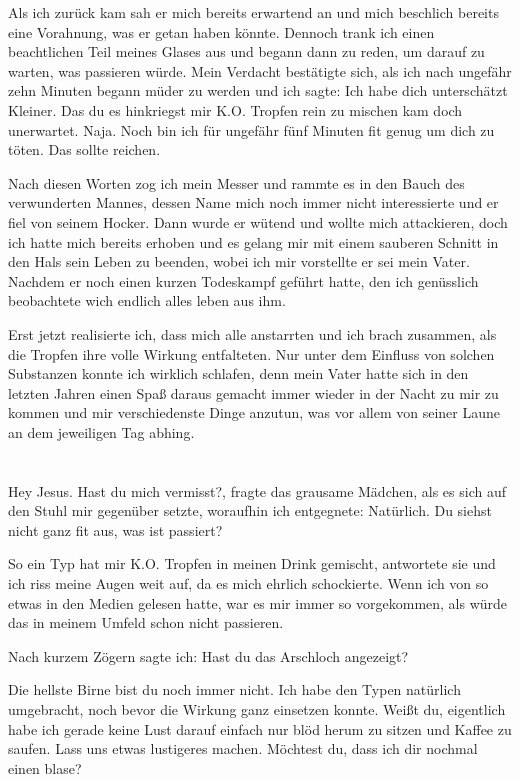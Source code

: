 \documentclass[11pt, a5paper]{article}
\begin{document}
\begin{spacing}{1.2}
		Als ich zurück kam sah er mich bereits erwartend an und mich beschlich bereits eine Vorahnung, was er getan haben könnte. Dennoch trank ich einen beachtlichen Teil meines Glases aus und begann dann zu reden, um darauf zu warten, was passieren würde. Mein Verdacht bestätigte sich, als ich nach ungefähr zehn Minuten begann müder zu werden und ich sagte: \frqq Ich habe dich unterschätzt Kleiner. Das du es hinkriegst mir K.O. Tropfen rein zu mischen kam doch unerwartet. Naja. Noch bin ich für ungefähr fünf Minuten fit genug um dich zu töten. Das sollte reichen.\flqq
		
		Nach diesen Worten zog ich mein Messer und rammte es in den Bauch des verwunderten Mannes, dessen Name mich noch immer nicht interessierte und er fiel von seinem Hocker. Dann wurde er wütend und wollte mich attackieren, doch ich hatte mich bereits erhoben und es gelang mir mit einem sauberen Schnitt in den Hals sein Leben zu beenden, wobei ich mir vorstellte er sei mein Vater. Nachdem er noch einen kurzen Todeskampf geführt hatte, den ich genüsslich beobachtete wich endlich alles leben aus ihm.
		
		Erst jetzt realisierte ich, dass mich alle anstarrten und ich brach zusammen, als die Tropfen ihre volle Wirkung entfalteten. Nur unter dem Einfluss von solchen Substanzen konnte ich wirklich schlafen, denn mein Vater hatte sich in den letzten Jahren einen Spaß daraus gemacht immer wieder in der Nacht zu mir zu kommen und mir verschiedenste Dinge anzutun, was vor allem von seiner Laune an dem jeweiligen Tag abhing.\newpage
		
		\section{}
		\frqq Hey Jesus. Hast du mich vermisst?\flqq, fragte das grausame Mädchen, als es sich auf den Stuhl mir gegenüber setzte, woraufhin ich entgegnete: \frqq Natürlich. Du siehst nicht ganz fit aus, was ist passiert?\flqq
		
		\frqq So ein Typ hat mir K.O. Tropfen in meinen Drink gemischt\flqq , antwortete sie und ich riss meine Augen weit auf, da es mich ehrlich schockierte. Wenn ich von so etwas in den Medien gelesen hatte, war es mir immer so vorgekommen, als würde das in meinem Umfeld schon nicht passieren.
		
		Nach kurzem Zögern sagte ich: \frqq Hast du das Arschloch angezeigt?\flqq
		
		\frqq Die hellste Birne bist du noch immer nicht. Ich habe den Typen natürlich umgebracht, noch bevor die Wirkung ganz einsetzen konnte. Weißt du, eigentlich habe ich gerade keine Lust darauf einfach nur blöd herum zu sitzen und Kaffee zu saufen. Lass uns etwas lustigeres machen. Möchtest du, dass ich dir nochmal einen blase?\flqq
		

\end{spacing}
\end{document}
